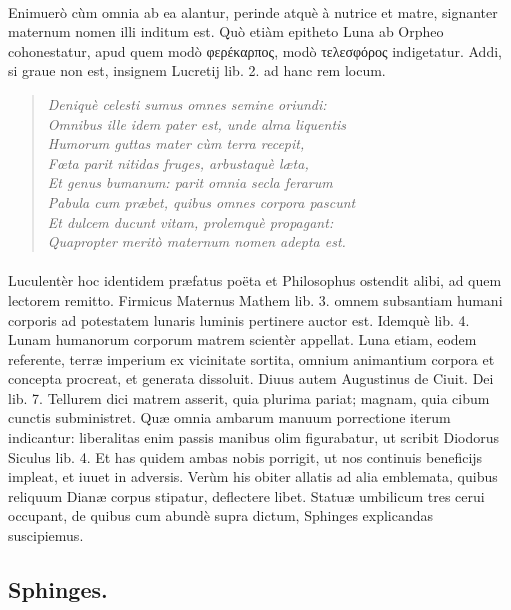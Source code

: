 \documentclass[a4paper, 11pt, oneside, polutonikogreek, latin]{article}
\begin{document}
\paragraph{}
Enimuerò cùm omnia ab ea alantur, perinde atquè à nutrice et matre, signanter maternum nomen illi inditum est. Quò etiàm epitheto Luna ab Orpheo cohonestatur, apud quem modò φερέκαρπος, modò τελεσφόρος indigetatur. Addi, si graue non est, insignem Lucretij lib. 2. ad hanc rem locum.
\begin{quote}
\emph{Deniquè celesti sumus omnes semine oriundi:}\\
\emph{Omnibus ille idem pater est, unde alma liquentis}\\
\emph{Humorum guttas mater cùm terra recepit,}\\
\emph{Fœta parit nitidas fruges, arbustaquè læta,}\\
\emph{Et genus bumanum: parit omnia secla ferarum}\\
\emph{Pabula cum præbet, quibus omnes corpora pascunt}\\
\emph{Et dulcem ducunt vitam, prolemquè propagant:}\\
\emph{Quapropter meritò maternum nomen adepta est.}\\
\end{quote}
\vspace*{-8mm}
\paragraph{}
Luculentèr hoc identidem præfatus poëta et Philosophus ostendit alibi, ad quem lectorem remitto. Firmicus Maternus Mathem lib. 3. omnem subsantiam humani corporis ad potestatem lunaris luminis pertinere auctor est. Idemquè lib. 4. Lunam humanorum corporum matrem scientèr appellat. Luna etiam, eodem referente, terræ imperium ex vicinitate sortita, omnium animantium corpora et concepta procreat, et generata dissoluit. Diuus autem Augustinus de Ciuit. Dei lib. 7. Tellurem dici matrem asserit, quia plurima pariat; magnam, quia cibum cunctis subministret. Quæ omnia ambarum manuum porrectione iterum indicantur: liberalitas enim passis manibus olim figurabatur, ut scribit Diodorus Siculus lib. 4. Et has quidem ambas nobis porrigit, ut nos continuis beneficijs impleat, et iuuet in adversis. Verùm his obiter allatis ad alia emblemata, quibus reliquum Dianæ corpus stipatur, deflectere libet. Statuæ umbilicum tres cerui occupant, de quibus cum abundè supra dictum, Sphinges explicandas suscipiemus.
\clearpage
\subsection{Sphinges.}
\end{document}
